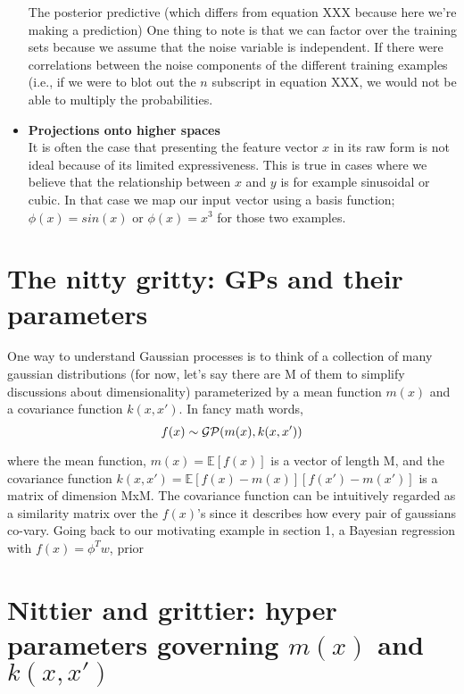 \documentclass[twoside]{article}
\begin{document}
\begin{itemize}
The posterior predictive (which differs from equation XXX because here we're making a prediction) 
One thing to note is that we can factor over the training sets because we assume that the noise variable is independent. If there were correlations between the noise components of the different training examples (i.e., if we were to blot out the $n$ subscript in equation XXX, we would not be able to multiply the probabilities. \\
\item\textbf{Projections onto higher spaces}\\
It is often the case that presenting the feature vector $x$ in its raw form is not ideal because of its limited expressiveness. This is true in cases where we believe that the relationship between $x$ and $y$ is for example sinusoidal or cubic. In that case we map our input vector using a basis function; $\phi(x) = sin(x)$ or $\phi(x) = x^3$ for those two examples.  

\end{itemize}

\section{The nitty gritty: GPs and their parameters}
One way to understand Gaussian processes is to think of a collection of  many gaussian distributions (for now, let's say there are M of them to simplify discussions about dimensionality) parameterized by a mean function $m(x)$ and a covariance function $k(x, x')$. In fancy math words, \\ 
\begin{equation}
f(x) \sim  \mathcal{GP}(m(x), k(x, x')) \\
\end{equation}

where the mean function, $m(x) = \mathbb{E} [f(x)]$ is a vector of length M,  and  the covariance function $k(x, x') = \mathbb{E}[f(x) - m(x)][f(x') - m(x')]$ is a matrix of dimension MxM. The covariance function can be intuitively regarded as a similarity matrix over the $f(x)$'s since it describes how every pair of gaussians co-vary. 
Going back to our motivating example in section 1, a Bayesian regression with $f(x) = \phi^Tw$, prior 

\section{Nittier and grittier: hyper parameters governing $m(x)$ and $k(x, x')$}
\end{document}
